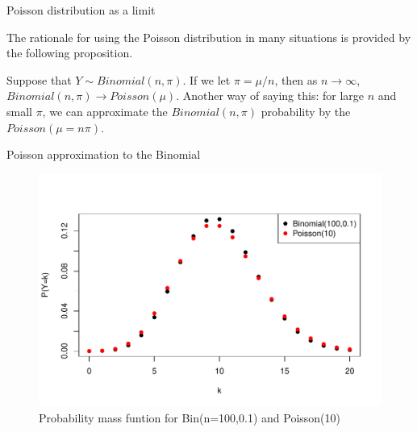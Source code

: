 \documentclass[10pt,handout]{beamer}\usepackage[]{graphicx}\usepackage[]{color}
\makeatletter
\def\maxwidth{ %
  \ifdim\Gin@nat@width>\linewidth
    \linewidth
  \else
    \Gin@nat@width
  \fi
}
\newenvironment{knitrout}{}{} %
\makeatother
\begin{document}
\begin{frame}{Poisson distribution as a limit}
	
	The rationale for using the Poisson distribution in many situations is provided by the following proposition.
	
	\vspace*{0.5in}
	
	\begin{proposition}
		Suppose that $Y \sim Binomial(n,\pi)$. If we let $\pi = \mu/n$, then as $n \rightarrow \infty$, $Binomial(n,\pi) \rightarrow Poisson(\mu)$. Another way of saying this: for large $n$ and small $\pi$, we can approximate the $Binomial(n,\pi)$ probability by the $Poisson(\mu = n\pi)$. 
	\end{proposition}
	
\end{frame}


\begin{frame}{Poisson approximation to the Binomial}
	
	
\begin{knitrout}\tiny
{}\color{fgcolor}\begin{figure}

{\centering \includegraphics[width=\maxwidth]{figure/unnamed-chunk-12-1} 

}

\caption[Probability mass funtion for Bin(n=100,0.1) and Poisson(10)]{Probability mass funtion for Bin(n=100,0.1) and Poisson(10)}\label{fig:unnamed-chunk-12}
\end{figure}


\end{knitrout}
	
\end{frame}
\end{document}
